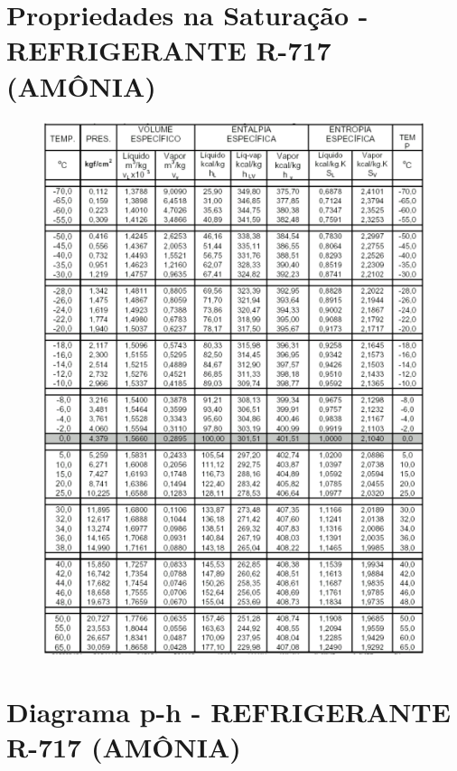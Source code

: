 \documentclass[
	12pt,				%
	openright,			%
	oneside,			%
	a4paper,			%
	english,			%
	french,				%
	spanish,			%
	brazil				%
	]{abntex2}
\begin{document}
\begin{anexosenv}

\chapter{Propriedades na Saturação - REFRIGERANTE R-717 (AMÔNIA)}

\begin{figure}[H]
\begin{center}
\includegraphics[scale=1.1]{../../Pictures/tabelaamonia.png} 
\end{center}
\end{figure}

\chapter{Diagrama p-h - REFRIGERANTE R-717 (AMÔNIA)}


\end{anexosenv}
\end{document}
